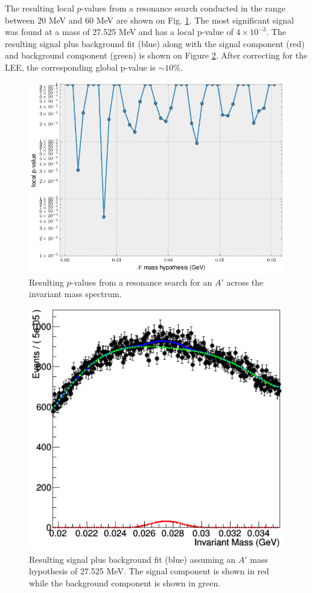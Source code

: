 The resulting local $p$-values from a resonance search conducted in the range 
between 20 MeV and 60 MeV are shown on Fig. \ref{fig:local_p_values}. 
The most significant signal
was found at a mass of 27.525 MeV and has a local p-value of $4 \times 10^{-3}$.
The resulting signal plus background fit (blue) along with the signal component 
(red) and background component (green) is shown on Figure \ref{fig:fit_27}.
After correcting for the LEE, the corresponding global p-value is 
$\sim 10\%$.
\begin{figure}[t]
    \centering
    \includegraphics[width=\textwidth]{images/final_p_values.png}
    \caption{Resulting $p$-values from a resonance search for an $A'$ across the
    invariant mass spectrum.}
    \label{fig:local_p_values}
\end{figure}

\begin{figure}[ht]
    \centering
    \includegraphics[width=.6\textwidth]{images/fit27.png}
    \caption{Resulting signal plus background fit (blue) assuming an $A'$ mass hypothesis
             of 27.525 MeV.  The signal component is shown in red while the 
         background component is shown in green.}
    \label{fig:fit_27}
\end{figure}

